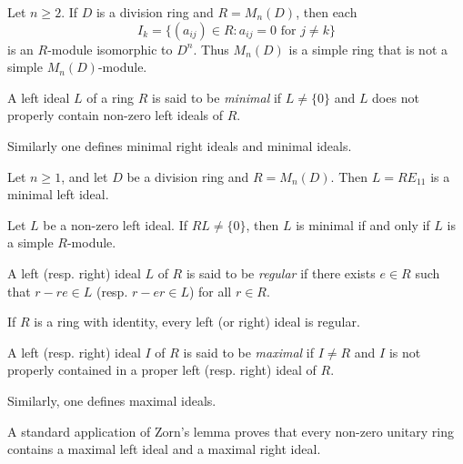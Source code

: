 \begin{example}
	\label{exa:I_k}
	Let $n\geq2$.  If $D$ is a division ring and $R=M_n(D)$, then each 
	\[
	I_k=\{ (a_{ij})\in R:a_{ij}=0\text{ for $j\ne k$}\}
	\]
	is an $R$-module isomorphic to $D^n$. 
	Thus $M_{n}(D)$ is a simple ring that is not a simple $M_n(D)$-module.
\end{example}

\begin{definition}
\label{def:minimal_left_ideal}
A left ideal $L$ of a ring $R$ is said to be \emph{minimal} if $L\ne\{0\}$ and 
$L$ does not properly contain non-zero left ideals of $R$. 
\end{definition}

Similarly one defines
minimal right ideals and minimal ideals. 

\begin{example}
	Let $n\geq1$, and let $D$ be a division ring and $R=M_n(D)$. Then $L=RE_{11}$ 
	is a minimal left ideal.
\end{example}

\begin{example}
	Let $L$ be a non-zero left ideal. If $RL\ne\{0\}$, then
	$L$ is minimal if and only if $L$ is a simple $R$-module. 
\end{example}

\begin{definition}
\label{def:regular}
A left (resp. right) ideal $L$ of $R$ is said to be \emph{regular} if
there exists $e\in R$ such that $r-re\in L$ (resp.  $r-er\in L$) for all $r\in R$.
\end{definition}

If $R$ is a ring with identity, every left (or right) ideal is regular. 

\begin{definition}
A left (resp. right) ideal $I$ of $R$ is said to be \emph{maximal} if $I\ne R$ and $I$ is not properly contained 
in a proper left (resp. right) ideal of $R$. 
\end{definition}

Similarly, one defines maximal ideals. 

A standard application of Zorn's lemma proves that every non-zero unitary ring
contains a maximal left ideal and a maximal right ideal. 

